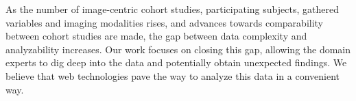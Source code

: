 \documentclass[journal]{style/vgtc} 			          %
\begin{document}
%
%
As the number of image-centric cohort studies, participating subjects, gathered variables and imaging modalities rises, and advances towards comparability between cohort studies are made, the gap between data complexity and analyzability increases.
%
Our work focuses on closing this gap, allowing the domain experts to dig deep into the data and potentially obtain unexpected findings.
%
We believe that web technologies pave the way to analyze this data in a convenient way.
%
%
\end{document}
